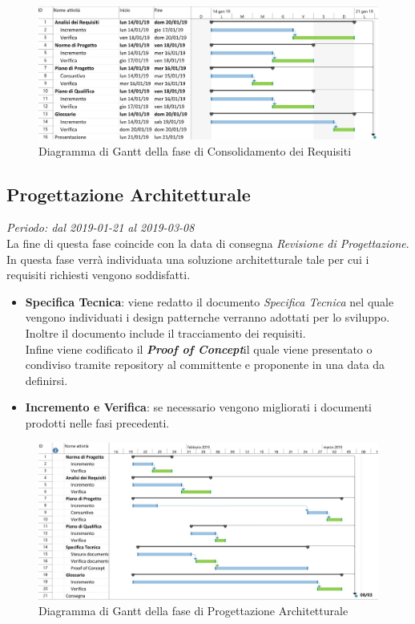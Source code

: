 \begin{figure}[H]
	\label{fig:gantt_con}
	\includegraphics[scale=0.6]{res/images/gantt_cons.jpg}
	\caption{Diagramma di Gantt della fase di Consolidamento dei Requisiti}
\end{figure}

\subsection{Progettazione Architetturale}
\textit{Periodo: dal 2019-01-21 al 2019-03-08} \\
La fine di questa fase coincide con la data di consegna \textit{Revisione di 
Progettazione}. In questa fase verrà individuata una soluzione architetturale 
tale per cui i requisiti richiesti vengono soddisfatti.
\begin{itemize}
	\item \textbf{Specifica Tecnica}: viene redatto il documento 
	\textit{Specifica Tecnica} nel quale vengono individuati i design 
	pattern\glosp che verranno adottati per lo sviluppo. Inoltre il documento 
	include il tracciamento dei requisiti.\\
	Infine viene codificato il \textbf{\textit{Proof of Concept}}\glosp il 
	quale viene presentato o condiviso tramite repository al committente e 
	proponente in una data da definirsi.
	\item \textbf{Incremento e Verifica}: se necessario vengono migliorati i 
	documenti prodotti nelle fasi precedenti.
\end{itemize}
\centering
\begin{figure}[H]
	\includegraphics[scale=0.5]{res/images/gantt_pa.jpg}
	\caption{Diagramma di Gantt della fase di Progettazione Architetturale}
\end{figure}


